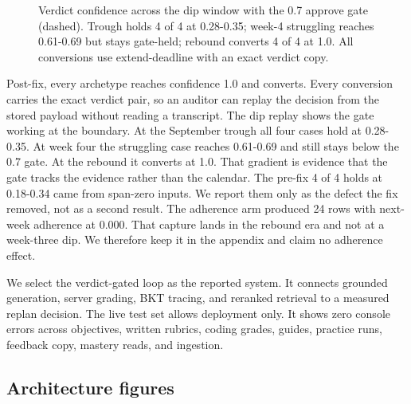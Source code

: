 \documentclass[sn-mathphys,Numbered]{sn-jnl}%
\theoremstyle{thmstyleone}%
\theoremstyle{thmstyletwo}%
\theoremstyle{thmstylethree}%
\begin{document}
\begin{figure}[htbp]%
\centering
{}
\caption{Verdict confidence across the dip window with the 0.7 approve gate (dashed). Trough holds 4 of 4 at 0.28-0.35; week-4 struggling reaches 0.61-0.69 but stays gate-held; rebound converts 4 of 4 at 1.0. All conversions use extend-deadline with an exact verdict copy.}\label{fig:verdictdip}
\end{figure}

Post-fix, every archetype reaches confidence 1.0 and converts. Every conversion carries the exact verdict pair, so an auditor can replay the decision from the stored payload without reading a transcript. The dip replay shows the gate working at the boundary. At the September trough all four cases hold at 0.28-0.35. At week four the struggling case reaches 0.61-0.69 and still stays below the 0.7 gate. At the rebound it converts at 1.0. That gradient is evidence that the gate tracks the evidence rather than the calendar. The pre-fix 4 of 4 holds at 0.18-0.34 came from span-zero inputs. We report them only as the defect the fix removed, not as a second result. The adherence arm produced 24 rows with next-week adherence at 0.000. That capture lands in the rebound era and not at a week-three dip. We therefore keep it in the appendix and claim no adherence effect.

We select the verdict-gated loop as the reported system. It connects grounded generation, server grading, BKT tracing, and reranked retrieval to a measured replan decision. The live test set allows deployment only. It shows zero console errors across objectives, written rubrics, coding grades, guides, practice runs, feedback copy, mastery reads, and ingestion.

\subsection{Architecture figures}\label{subsec45}
\end{document}
